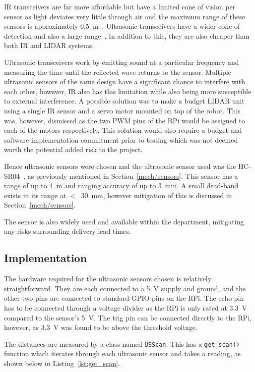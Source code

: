 IR transceivers are far more affordable but have a limited cone of
vision per sensor as light deviates very little through air and the
maximum range of these sensors is approximately \SI{0.5}{\m}~\cite{InfraredDatasheet}.
Ultrasonic transceivers have a wider cone of
detection and also a large range~\cite{HCSR04datasheet}. In addition to
this, they are also cheaper than both IR and LIDAR systems.

Ultrasonic transceivers work by emitting sound at a particular frequency
and measuring the time until the reflected wave returns to the sensor.
Multiple ultrasonic sensors of the same design have a significant chance to interfere with each other,
however, IR also has this limitation
while also being more susceptible to external interference. A possible solution
was to make a budget LIDAR unit using a single IR sensor and a
servo motor mounted on top of the robot. This was, however, dismissed as
the two PWM pins of the RPi would be assigned to each of the
motors respectively. This solution would also require a budget and
software implementation commitment prior to testing which was not deemed
worth the potential added risk to the project.

Hence ultrasonic sensors were chosen and the ultrasonic sensor used was
the HC-SR04~\cite{HCSR04datasheet}, as previously mentioned in Section~\ref{mech/sensors}. This sensor has a range of up to \SI{4}{\m} and
ranging accuracy of up to \SI{3}{\mm}. A small dead-band exists in its
range at $<$~\SI{30}{\mm}, however mitigation of this is discussed in Section~\ref{mech/sensors}. 

The sensor is also widely used and available within the
department, mitigating any risks surrounding delivery lead times.

\subsection{Implementation}\label{elec/range/impl}
The hardware required for the ultrasonic sensors chosen is relatively straightforward.
They are each connected to a \SI{5}{\volt} supply and ground, and the other two pins are
connected to standard GPIO pins on the RPi. The echo pin has to be connected through
a voltage divider as the RPi is only rated at \SI{3.3}{\volt} compared to the sensor's \SI{5}{\volt}. The
trig pin can be connected directly to the RPi, however, as \SI{3.3}{\volt} was found to be above
the threshold voltage.

The distances are measured by a class named \verb|USScan|. This has a
\verb|get_scan()| function which iterates through each ultrasonic sensor and takes a reading,
as shown below in Listing~\ref{lst:get_scan}.

